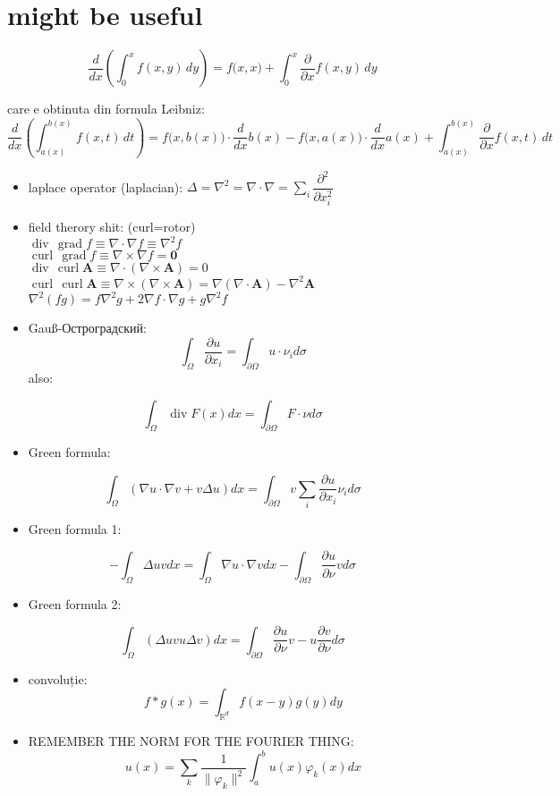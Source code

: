 \documentclass[11pt]{article}
\date{\today}
\title{}
\newcommand{\R}{\mathbb{R}} \newcommand{\C}{\mathbb{C}}
\renewcommand{\phi}{\varphi} \newcommand{\parti}[2]{\frac{\partial #1}{\partial #2}}
\begin{document}
\section*{might be useful}
\label{sec:org3698df7}
\[ \frac{d}{dx} \left (\int_{0}^{x} f(x,y)\,dy \right) = f\big(x,x) + \int_{0}^{x}\frac{\partial}{\partial x} f(x,y) \,dy\]

\medskip

care e obtinuta din formula Leibniz:
\[ \frac{d}{dx} \left (\int_{a(x)}^{b(x)}f(x,t)\,dt \right) = f\big(x,b(x)\big)\cdot \frac{d}{dx} b(x) - f\big(x,a(x)\big)\cdot \frac{d}{dx} a(x) + \int_{a(x)}^{b(x)}\frac{\partial}{\partial x} f(x,t) \,dt\]
\begin{itemize}
\item laplace operator (laplacian): \(\Delta = \nabla^2 = \nabla \cdot \nabla = \displaystyle \sum_i \dfrac{\partial^2}{\partial x_i^2}\)
\item field therory shit: (curl=rotor)\\
\(\operatorname{div}  \, \operatorname{grad} f          \equiv \nabla \cdot  \nabla f \equiv \nabla^2 f\)\\
\(\operatorname{curl} \, \operatorname{grad} f          \equiv \nabla \times \nabla f = \mathbf 0\)\\
\(\operatorname{div}  \, \operatorname{curl} \mathbf{A} \equiv \nabla \cdot  (\nabla \times \mathbf{A}) = 0\)\\
\(\operatorname{curl} \, \operatorname{curl} \mathbf{A} \equiv \nabla \times (\nabla \times \mathbf{A}) = \nabla (\nabla \cdot \mathbf{A}) - \nabla^2 \mathbf{A}\)\\
\(\nabla^2 (f g) = f \nabla^2 g + 2 \nabla f \cdot \nabla g + g \nabla^2 f\)
\item Gauß-Остроградский:
\[ \int_\Omega \parti{u}{x_i} = \int_{\partial \Omega}u \cdot \nu_i d \sigma \]
also:
\end{itemize}
\[ \int_\Omega \operatorname{div} F (x) dx = \int_{\partial \Omega} F  \cdot \nu d \sigma \]
\begin{itemize}
\item Green formula:
\end{itemize}
\[\int_\Omega (\nabla u \cdot \nabla v  + v \Delta u) dx = \int_{\partial \Omega} v \sum_i \parti{u}{x_i} \nu_i d \sigma \]
\begin{itemize}
\item Green formula 1:
\end{itemize}
\[ -\int_\Omega \Delta u v dx = \int_\Omega \nabla u \cdot \nabla v dx - \int_{\partial \Omega} \parti{u}{\nu} v  d \sigma \]
\begin{itemize}
\item Green formula 2:
\end{itemize}
\[ \int_\Omega (\Delta u v u\Delta v) dx = \int_{\partial \Omega} \parti{u}{\nu} v - u \parti{v}{\nu}  d \sigma \]
\begin{itemize}
\item convoluție:
\[ f*g (x) = \int_{\R^d} f(x-y) g(y)dy \]
\item REMEMBER THE NORM FOR THE FOURIER THING:
\[ u(x) = \sum_k \frac{1}{\|\phi_k\|^2} \int_a^b u(x) \phi_k(x) dx \]
\end{itemize}
\end{document}
